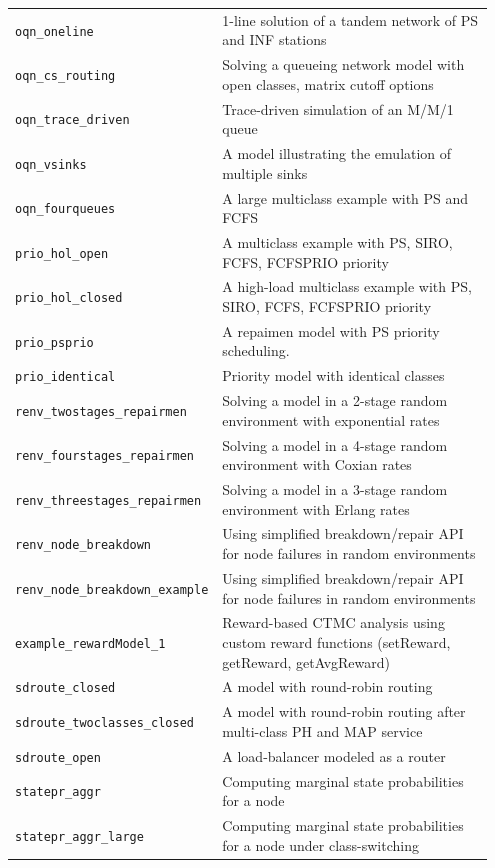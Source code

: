 \begin{footnotesize}
\begin{longtable}{|p{0.35\linewidth}|p{0.60\linewidth}|}
\texttt{oqn\_oneline} & 1-line solution of a tandem network of PS and INF stations\\
\texttt{oqn\_cs\_routing} & Solving a queueing network model with open classes, matrix cutoff options \\
\texttt{oqn\_trace\_driven} & Trace-driven simulation of an M/M/1 queue\\
\texttt{oqn\_vsinks} & A model illustrating the emulation of multiple sinks\\
\texttt{oqn\_fourqueues} & A large multiclass example with PS and FCFS\\
\hline
\texttt{prio\_hol\_open} & A multiclass example with PS, SIRO, FCFS, FCFSPRIO priority\\
\texttt{prio\_hol\_closed} & A high-load multiclass example with PS, SIRO, FCFS, FCFSPRIO priority\\
\texttt{prio\_psprio} & A repaimen model with PS priority scheduling. \\
\texttt{prio\_identical} & Priority model with identical classes\\
\hline
\texttt{renv\_twostages\_repairmen} &  Solving a model in a 2-stage random environment with exponential rates\\
\texttt{renv\_fourstages\_repairmen} &  Solving a model in a 4-stage random environment with Coxian rates \\
\texttt{renv\_threestages\_repairmen} &  Solving a model in a 3-stage random environment with Erlang rates\\
\texttt{renv\_node\_breakdown} &  Using simplified breakdown/repair API for node failures in random environments\\
\texttt{renv\_node\_breakdown\_example} &  Using simplified breakdown/repair API for node failures in random environments\\
\hline
\texttt{example\_rewardModel\_1} &  Reward-based CTMC analysis using custom reward functions (setReward, getReward, getAvgReward)\\
\hline
\texttt{sdroute\_closed} & A model with round-robin routing \\
\texttt{sdroute\_twoclasses\_closed} & A model with round-robin routing after multi-class PH and MAP service\\
\texttt{sdroute\_open} & A load-balancer modeled as a router\\
\hline
\texttt{statepr\_aggr} &  Computing marginal state probabilities for a node\\
\texttt{statepr\_aggr\_large} &  Computing marginal state probabilities for a node under class-switching\\

\end{longtable}
\end{footnotesize}
